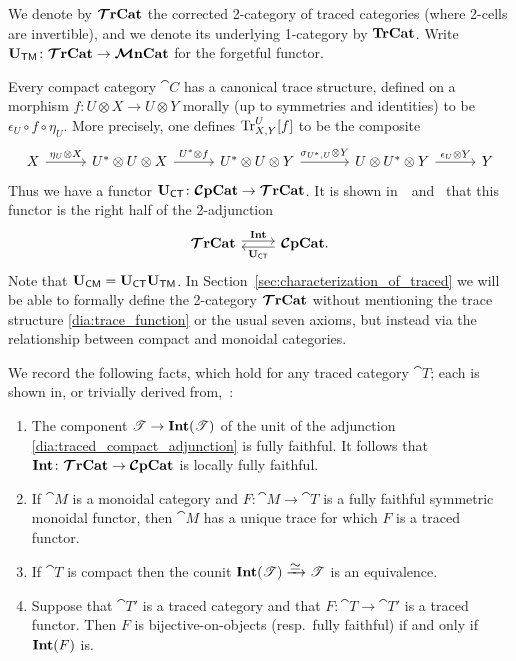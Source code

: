 \documentclass[11pt,oneside,article]{memoir}
\begin{document}
We denote by $\bm{\mathcal{T}}\mathbf{rCat}$ the corrected 2-category of traced categories (where 2-cells are invertible),
and we denote its underlying 1-category by $\mathbf{TrCat}$. Write $\mathbf{U}_{\mathsf{TM}}\colon\bm{\mathcal{T}}\mathbf{rCat}\to\bm{\mathcal{M}}\mathbf{nCat}$ for the
forgetful functor.

Every compact category $\cat{C}$ has a canonical trace structure, defined on a morphism $f\colon
U\otimes X\to U\otimes Y$ morally (up to symmetries and identities) to be $\epsilon_U\circ f\circ
\eta_U$. More precisely, one defines $\operatorname{Tr}^U_{X,Y}[f]$ to be the composite
\begin{equation*}
  \begin{tikzcd}[column sep=29pt]
    X\ar[r,"\eta_U\otimes X"]&
    U^*\otimes U\otimes X\ar[r,"U^*\otimes f"]&
    U^*\otimes U\otimes Y\ar[r,"\sigma_{U^*,U}\otimes Y"]&[6pt]
    U\otimes U^*\otimes Y\ar[r,"\epsilon_U\otimes Y"]&
    Y
  \end{tikzcd}
\end{equation*}
Thus we have a functor $\mathbf{U}_{\mathsf{CT}}\colon\bm{\mathcal{C}}\mathbf{pCat}\to\bm{\mathcal{T}}\mathbf{rCat}$. It is shown
in~\cite{JoyalStreetVerity}~and~\cite{HK} that this functor is the right half of the 2-adjunction
\begin{equation}
    \label{dia:traced_compact_adjunction}
  \begin{tikzcd}
    \TTrCat\arrow[r,shift left=.5ex, "\Int"]&\CCompCat\arrow[l,shift left=.5ex,"\UCT"].
  \end{tikzcd}
\end{equation}
Note that $\mathbf{U}_{\mathsf{CM}}=\mathbf{U}_{\mathsf{CT}}\mathbf{U}_{\mathsf{TM}}$. In Section~\ref{sec:characterization_of_traced} we will be able to
formally define the 2-category $\bm{\mathcal{T}}\mathbf{rCat}$ without mentioning the trace structure
\eqref{dia:trace_function} or the usual seven axioms, but instead via the relationship between
compact and monoidal categories.

\begin{remark}
    \label{rmk:fully_faithful_and_trace}
  We record the following facts, which hold for any traced category $\cat{T}$; each is shown in, or
  trivially derived from,~\cite{JoyalStreetVerity}:
  \begin{enumerate}[label={\upshape\roman*}.]
    \item The component $\mathscr{T}\to\mathbf{Int}(\mathscr{T})$ of the unit of the adjunction
      \eqref{dia:traced_compact_adjunction} is fully faithful. It follows that
      $\mathbf{Int}\colon\bm{\mathcal{T}}\mathbf{rCat}\to\bm{\mathcal{C}}\mathbf{pCat}$ is locally fully faithful.
    \item If $\cat{M}$ is a monoidal category and $F\colon\cat{M}\to\cat{T}$ is a fully faithful
      symmetric monoidal functor, then $\cat{M}$ has a unique trace for which $F$ is a traced
      functor.
    \item If $\cat{T}$ is compact then the counit
      $\Int(\cat{T})\To{\raisebox{-1ex}{$\equiv$}}\cat{T}$ is an equivalence.
    \item Suppose that $\cat{T'}$ is a traced category and that $F\colon \cat{T}\to \cat{T}'$ is a
      traced functor. Then $F$ is bijective-on-objects (resp.\ fully faithful) if and only if
      $\mathbf{Int}(F)$ is.
  \end{enumerate}
\end{remark}
\end{document}
